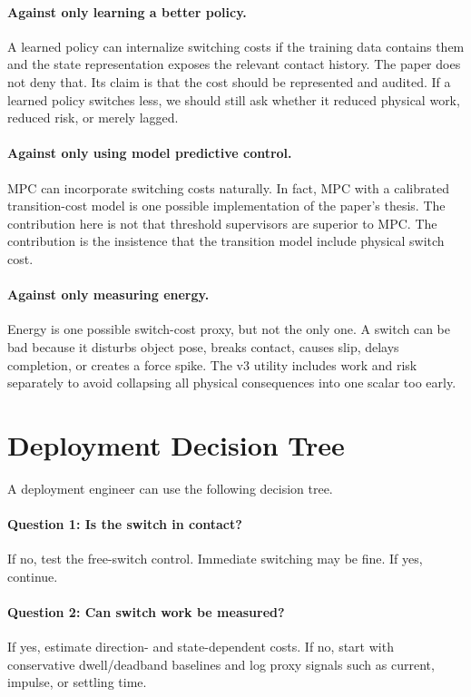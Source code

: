 \documentclass{article}
\begin{document}
\paragraph{Against only learning a better policy.}
A learned policy can internalize switching costs if the training data contains them and the state representation exposes the relevant contact history.
The paper does not deny that.
Its claim is that the cost should be represented and audited.
If a learned policy switches less, we should still ask whether it reduced physical work, reduced risk, or merely lagged.

\paragraph{Against only using model predictive control.}
MPC can incorporate switching costs naturally.
In fact, MPC with a calibrated transition-cost model is one possible implementation of the paper's thesis.
The contribution here is not that threshold supervisors are superior to MPC.
The contribution is the insistence that the transition model include physical switch cost.

\paragraph{Against only measuring energy.}
Energy is one possible switch-cost proxy, but not the only one.
A switch can be bad because it disturbs object pose, breaks contact, causes slip, delays completion, or creates a force spike.
The v3 utility includes work and risk separately to avoid collapsing all physical consequences into one scalar too early.

\section{Deployment Decision Tree}

A deployment engineer can use the following decision tree.

\paragraph{Question 1: Is the switch in contact?}
If no, test the free-switch control.
Immediate switching may be fine.
If yes, continue.

\paragraph{Question 2: Can switch work be measured?}
If yes, estimate direction- and state-dependent costs.
If no, start with conservative dwell/deadband baselines and log proxy signals such as current, impulse, or settling time.
\end{document}
